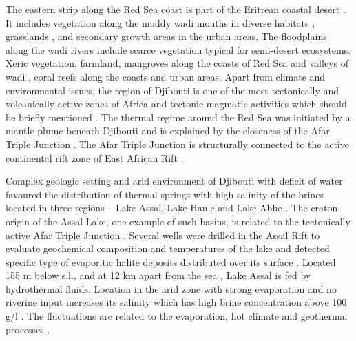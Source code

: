 \documentclass[jimaging,article,submit,pdftex,moreauthors]{Definitions/mdpi}
\begin{document}
The eastern strip along the Red Sea coast is part of the Eritrean coastal desert \cite{TESFAI2021104327}. It includes vegetation along the muddy wadi mouths in diverse habitats \cite{MEDIN201526}, grasslands \cite{ALI20231,IDOWU2020e00402}, and secondary growth areas in the urban areas. The floodplains along the wadi rivers include scarce vegetation typical for semi-desert ecosystems. Xeric vegetation, farmland, mangroves along the coasts of Red Sea and valleys of wadi \cite{BLANCOSACRISTAN2022157098,BEYIN2024100247}, coral reefs along the coasts \cite{Klaus2015,COWBURN2019182,GAPPER2024e38249} and urban areas. Apart from climate and environmental issues, the region of Djibouti is one of the most tectonically and volcanically active zones of Africa and tectonic-magmatic activities which should be briefly mentioned \cite{Chandrasekharam,MOUSSA2023104765,AYELE2024105236,JALLUDIN1994237}. The thermal regime around the Red Sea was initiated by a mantle plume beneath Djibouti and is explained by the closeness of the Afar Triple Junction \cite{RIME2023104519,GIDAFIE2024102037,DARRAH201316}. The Afar Triple Junction is structurally connected to the active continental rift zone of East African Rift \cite{Varet2022,Lemenkova202206,PINZUTI2010169,Lemenkova202205,MESHESHA2021e08634}. 

Complex geologic setting and arid environment of Djibouti with deficit of water favoured the distribution of thermal springs with high salinity of the brines located in three regions -- Lake Assal, Lake Hanle and Lake Abhe \cite{MOLOGNI2021107896}. The craton origin of the Assal Lake, one example of such basins, is related to the tectonically active Afar Triple Junction \cite{HOUSSEIN2010220,AWALEH2024102894,Houssein02112014}. Several wells were drilled in the Assal Rift to evaluate geochemical composition and temperatures of the lake \cite{DAMORE1998197} and detected specific type of evaporitic halite deposits distributed over its surface \cite{CASTANIER1992811}. Located 155 m below s.l., and at 12 km apart from the sea \cite{GASSE198967}, Lake Assal is fed by hydrothermal fluids. Location in the arid zone with strong evaporation and no riverine input increases its salinity which has high brine concentration above 100 g/l \cite{DEKOV2021120126}. The fluctuations are related to the evaporation, hot climate and geothermal processes \cite{ZAN1990561}. 

\end{document}
